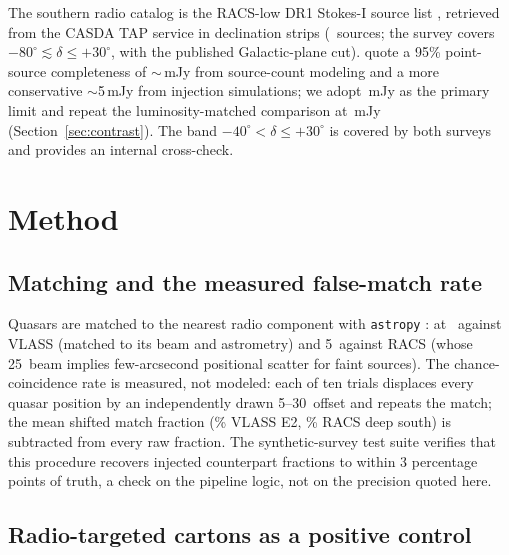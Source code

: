 \documentclass[twocolumn]{aastex631}
\newcommand{\code}[1]{\texttt{#1}}
\begin{document}
The southern radio catalog is the RACS-low DR1 Stokes-I source list
\citep[887.5\,MHz, 25\arcsec\ beam;][]{mcconnell2020, hale2021}, retrieved from the CASDA
TAP service in declination strips (\drRacsSrc\ sources; the survey covers $-80^\circ
\lesssim \delta \le +30^\circ$, with the published Galactic-plane cut). \citet{hale2021}
quote a 95\% point-source completeness of $\sim$\drSlimRacs\,mJy from source-count modeling and a
more conservative $\sim$5\,mJy from injection simulations; we adopt \drSlimRacs\,mJy as
the primary limit and repeat the luminosity-matched comparison at \drSlimRacsCons\,mJy
(Section~\ref{sec:contrast}). The band $-40^\circ < \delta \le +30^\circ$ is covered by
both surveys and provides an internal cross-check.

\section{Method}

\subsection{Matching and the measured false-match rate}

Quasars are matched to the nearest radio component with \code{astropy}
\citep{astropy}: at \drAlphaVlassRad\arcsec\ against VLASS (matched to its beam and astrometry) and
5\arcsec\ against RACS (whose 25\arcsec\ beam implies few-arcsecond positional scatter for
faint sources). The chance-coincidence rate is measured, not modeled: each of ten trials
displaces every quasar position by an independently drawn 5--30\arcmin\ offset and repeats the
match; the mean shifted match fraction (\drNorthFmPct\% VLASS E2, \drSouthFmPct\% RACS
deep south) is subtracted from every raw fraction. The synthetic-survey test suite
verifies that this procedure recovers injected counterpart fractions to within 3 percentage
points of truth, a check on the pipeline logic, not on the precision quoted here.

\subsection{Radio-targeted cartons as a positive control}
\label{sec:cartons}
\end{document}
